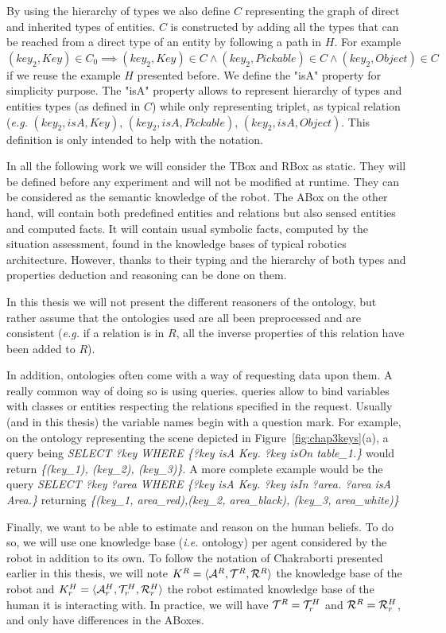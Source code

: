 \documentclass[a4paper,11pt,twoside]{StyleThese}
\begin{document}
By using the hierarchy of types we also define $C$ representing the graph of direct and inherited types of entities. $C$ is constructed by adding all the types that can be reached from a direct type of an entity by following a path in $H$. For example $(key_2, Key) \in C_0 \implies (key_2, Key) \in C \land (key_2, Pickable) \in C \land (key_2, Object) \in C$ if we reuse the example $H$ presented before.
We define the "isA" property for simplicity purpose. The "isA" property allows to represent hierarchy of types and entities types (as defined in $C$) while only representing triplet, as typical relation (\textit{e.g.} $(key_2, isA, Key)$, $(key_2, isA, Pickable)$, $(key_2, isA, Object)$. This definition is only intended to help with the notation.

In all the following work we will consider the TBox and RBox as static. They will be defined before any experiment and will not be modified at runtime. They can be considered as the semantic knowledge of the robot. The ABox on the other hand, will contain both predefined entities and relations but also sensed entities and computed facts. It will contain usual symbolic facts, computed by the situation assessment, found in the knowledge bases of typical robotics architecture. However, thanks to their typing and the hierarchy of both types and properties deduction and reasoning can be done on them.

In this thesis we will not present the different reasoners of the ontology, but rather assume that the ontologies used are all been preprocessed and are consistent (\textit{e.g.} if a relation is in $R$, all the inverse properties of this relation have been added to $R$).

In addition, ontologies often come with a way of requesting data upon them. A really common way of doing so is using \sparql{} queries. \sparql{} queries allow to bind variables with classes or entities respecting the relations specified in the request. Usually (and in this thesis) the variable names begin with a question mark. For example, on the ontology representing the scene depicted in Figure~\ref{fig:chap3keys}(a), a query being \textit{SELECT ?key WHERE \{?key isA Key. ?key isOn table\_1.\}} would return \textit{\{(key\_1), (key\_2), (key\_3)\}}. A more complete example would be the query \textit{SELECT ?key ?area WHERE \{?key isA Key. ?key isIn ?area. ?area isA Area.\}} returning \textit{\{(key\_1, area\_red),(key\_2, area\_black), (key\_3, area\_white)\}}


Finally, we want to be able to estimate and reason on the human beliefs. To do so, we will use one knowledge base (\textit{i.e.} ontology) per agent considered by the robot in addition to its own. To follow the notation of Chakraborti \cite{chakraborti2018human} presented earlier in this thesis, we will note $K^R = \langle \mathcal{A}^R, \mathcal{T}^R, \mathcal{R}^R \rangle$ the knowledge base of the robot and $K^H_r = \langle \mathcal{A}^H_r, \mathcal{T}^H_r, \mathcal{R}^H_r \rangle$ the robot estimated knowledge base of the human it is interacting with. In practice, we will have $\mathcal{T}^R = \mathcal{T}^H_r$ and $\mathcal{R}^R = \mathcal{R}^H_r$, and only have differences in the ABoxes.
\end{document}
